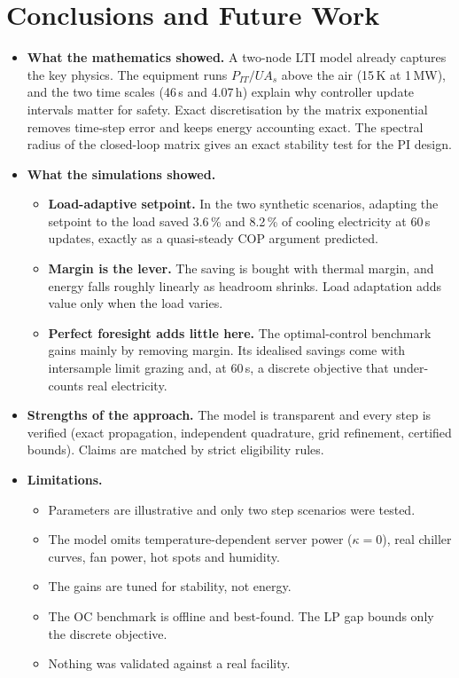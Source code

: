 \documentclass[12pt,a4paper]{report}
\theoremstyle{definition}
\begin{document}
\chapter{Conclusions and Future Work}
\begin{itemize}
\item \textbf{What the mathematics showed.} A two-node LTI model already captures the key physics. The equipment runs $P_{IT}/UA_s$ above the air (15\,K at 1\,MW), and the two time scales (46\,s and 4.07\,h) explain why controller update intervals matter for safety. Exact discretisation by the matrix exponential removes time-step error and keeps energy accounting exact. The spectral radius of the closed-loop matrix gives an exact stability test for the PI design.
\item \textbf{What the simulations showed.}
\begin{itemize}
\item \textbf{Load-adaptive setpoint.} In the two synthetic scenarios, adapting the setpoint to the load saved 3.6\,\% and 8.2\,\% of cooling electricity at 60\,s updates, exactly as a quasi-steady COP argument predicted.
\item \textbf{Margin is the lever.} The saving is bought with thermal margin, and energy falls roughly linearly as headroom shrinks. Load adaptation adds value only when the load varies.
\item \textbf{Perfect foresight adds little here.} The optimal-control benchmark gains mainly by removing margin. Its idealised savings come with intersample limit grazing and, at 60\,s, a discrete objective that under-counts real electricity.
\end{itemize}
\item \textbf{Strengths of the approach.} The model is transparent and every step is verified (exact propagation, independent quadrature, grid refinement, certified bounds). Claims are matched by strict eligibility rules.
\item \textbf{Limitations.}
\begin{itemize}
\item Parameters are illustrative and only two step scenarios were tested.
\item The model omits temperature-dependent server power ($\kappa=0$), real chiller curves, fan power, hot spots and humidity.
\item The gains are tuned for stability, not energy.
\item The OC benchmark is offline and best-found. The LP gap bounds only the discrete objective.
\item Nothing was validated against a real facility.
\end{itemize}
\end{itemize}
\end{document}
